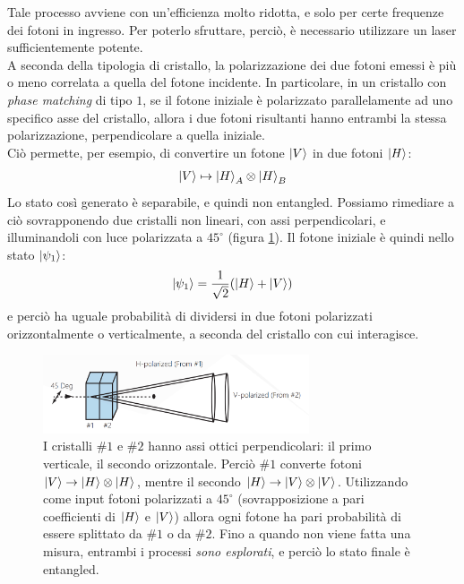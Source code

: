 \documentclass[../../InformazioneQuantistica.tex]{subfiles}
\begin{document}
Tale processo avviene con un'efficienza molto ridotta, e solo per certe frequenze dei fotoni in ingresso. Per poterlo sfruttare, perciò, è necessario utilizzare un laser sufficientemente potente.\\

A seconda della tipologia di cristallo, la polarizzazione dei due fotoni emessi è più o meno correlata a quella del fotone incidente. In particolare, in un cristallo con \textit{phase matching} di tipo $1$, se il fotone iniziale è polarizzato parallelamente ad uno specifico asse del cristallo, allora i due fotoni risultanti hanno entrambi la stessa polarizzazione, perpendicolare a quella iniziale.\\
Ciò permette, per esempio, di convertire un fotone $\Ket{V}$ in due fotoni $\Ket{H}$:
\begin{align*}
    \Ket{V} \mapsto \Ket{H}_A \otimes \Ket{H}_B
\end{align*}
Lo stato così generato è separabile, e quindi non entangled. Possiamo rimediare a ciò sovrapponendo due cristalli non lineari, con assi perpendicolari, e illuminandoli con luce polarizzata a $45^\circ$ (figura \ref{fig:entanglement_gen}). Il fotone iniziale è quindi nello stato $\Ket{\psi_1}$:
\begin{align*}
    \Ket{\psi_1} = \frac{1}{\sqrt{2}}(\Ket{H} + \Ket{V})
\end{align*}
e perciò ha uguale probabilità di dividersi in due fotoni polarizzati orizzontalmente o verticalmente, a seconda del cristallo con cui interagisce.

\begin{figure}[H]
    \centering
    \includegraphics[width=0.7\textwidth]{Immagini/28_3/entanglement_gen.jpg}
    \caption{I cristalli $\#1$ e $\#2$ hanno assi ottici perpendicolari: il primo verticale, il secondo orizzontale. Perciò $\#1$ converte fotoni $\Ket{V} \to \Ket{H}\otimes \Ket{H}$, mentre il secondo $\Ket{H} \to \Ket{V}\otimes \Ket{V}$. Utilizzando come input fotoni polarizzati a $45^\circ$ (sovrapposizione a pari coefficienti di $\Ket{H}$ e $\Ket{V}$) allora ogni fotone ha pari probabilità di essere splittato da $\#1$ o da $\#2$. Fino a quando non viene fatta una misura, entrambi i processi \textit{sono esplorati}, e perciò lo stato finale è entangled.}
    \label{fig:entanglement_gen}
\end{figure}
\end{document}
